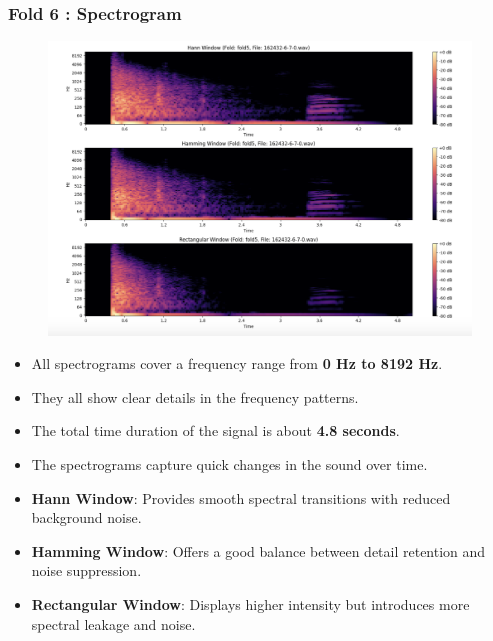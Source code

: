 \documentclass[a4paper,12pt]{article}
\begin{document}
    \subsubsection{Fold 6 : Spectrogram}
    \begin{figure}[H]
        \centering
        \includegraphics[width=1\linewidth]{Fold6.png}
    \end{figure}
    \begin{itemize}
        \item All spectrograms cover a frequency range from  \textbf{0 Hz to 8192 Hz}.
        \item They all show clear details in the frequency patterns.
        \item The total time duration of the signal is about \textbf{4.8 seconds}.
        \item The spectrograms capture quick changes in the sound over time.
        \item \textbf{Hann Window}:  Provides smooth spectral transitions with reduced background noise.
        \item \textbf{Hamming Window}: Offers a good balance between detail retention and noise suppression.
        \item \textbf{Rectangular Window}: Displays higher intensity but introduces more spectral leakage and noise.
    \end{itemize}
\newpage
\end{document}
